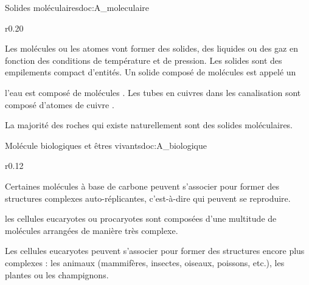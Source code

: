 \vspace*{-4pt}
\begin{doc}{Solides moléculaires}{doc:A_moleculaire}
  \begin{wrapfigure}{r}{0.20\linewidth}
    \vspace*{-32pt}
    \centering
  \end{wrapfigure}
  \strut\vspace*{-20pt}
  
  \begin{importants}
    Les molécules ou les atomes vont former des solides, des liquides ou des gaz en fonction des conditions de température et de pression.
    Les solides sont des empilements compact d'entités. Un solide composé de molécules est appelé un 
  \end{importants}
  \exemple* l'eau est composé de molécules .
  Les tubes en cuivres dans les canalisation sont composé d'atomes de cuivre .

  La majorité des roches qui existe naturellement sont des solides moléculaires.
\end{doc}

\begin{doc}{Molécule biologiques et êtres vivants}{doc:A_biologique}
  \begin{wrapfigure}[2]{r}{0.12\linewidth}
    \vspace*{-28pt}
    \centering  
  \end{wrapfigure}
  \strut\vspace*{-20pt}
  
  \begin{importants}
    Certaines molécules à base de carbone peuvent s'associer pour former des structures complexes auto-réplicantes, c'est-à-dire qui peuvent se reproduire.
  \end{importants}
  \exemple* les cellules eucaryotes ou procaryotes sont composées d'une multitude de molécules arrangées de manière très complexe.

  \begin{importants}
    Les cellules eucaryotes peuvent s'associer pour former des structures encore plus complexes : les animaux (mammifères, insectes, oiseaux, poissons, etc.), les plantes ou les champignons.
  \end{importants}

  \vspace*{-14pt}
  \begin{center}
  \end{center}
\end{doc}